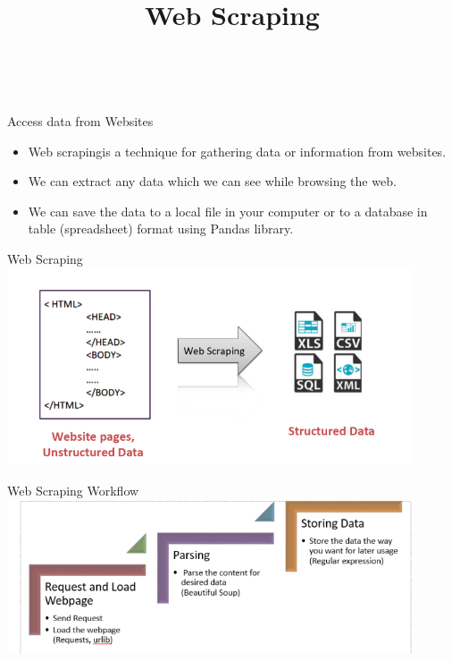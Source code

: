\documentclass[aspectratio=169,12pt]{beamer}
\begin{document}
{\1
\begin{frame}
	\title{Web Scraping}​
\titlepage
\end{frame}
}



\begin{frame}[t]{Access data from Websites}
\begin{itemize}
\itemsep2em 
\item Web scrapingis a technique for gathering data or information from websites.
\item We can extract any data which we can see while browsing the web. 
\item We can save the data to a local file in your computer or to a 
database in table (spreadsheet) format using Pandas library.
\end{itemize}
\end{frame}

\begin{frame}{Web Scraping}
\includegraphics[width=0.9\textwidth,height=0.7\textheight]{Images/AIML_WS_IMG1.png}
\end{frame}

\begin{frame}{Web Scraping Workflow​}
\includegraphics[width=0.9\textwidth,height=0.7\textheight]{Images/AIML_WS_IMG4.png}
\end{frame}
\end{document}
